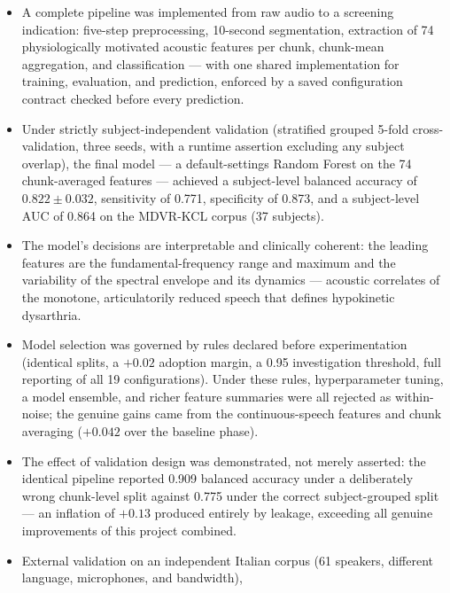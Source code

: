 \begin{itemize}
  \item A complete pipeline was implemented from raw audio to a
        screening indication: five-step preprocessing, 10-second
        segmentation, extraction of 74 physiologically motivated
        acoustic features per chunk, chunk-mean aggregation, and
        classification --- with one shared implementation for training,
        evaluation, and prediction, enforced by a saved configuration
        contract checked before every prediction.
  \item Under strictly subject-independent validation (stratified
        grouped 5-fold cross-validation, three seeds, with a runtime
        assertion excluding any subject overlap), the final model ---
        a default-settings Random Forest on the 74 chunk-averaged
        features --- achieved a subject-level balanced accuracy of
        $0.822 \pm 0.032$, sensitivity of 0.771, specificity of 0.873,
        and a subject-level AUC of 0.864 on the MDVR-KCL corpus
        (37 subjects).
  \item The model's decisions are interpretable and clinically
        coherent: the leading features are the fundamental-frequency
        range and maximum and the variability of the spectral envelope
        and its dynamics --- acoustic correlates of the monotone,
        articulatorily reduced speech that defines hypokinetic
        dysarthria.
  \item Model selection was governed by rules declared before
        experimentation (identical splits, a $+0.02$ adoption margin,
        a 0.95 investigation threshold, full reporting of all 19
        configurations). Under these rules, hyperparameter tuning, a
        model ensemble, and richer feature summaries were all rejected
        as within-noise; the genuine gains came from the
        continuous-speech features and chunk averaging ($+0.042$ over
        the baseline phase).
  \item The effect of validation design was demonstrated, not merely
        asserted: the identical pipeline reported 0.909 balanced
        accuracy under a deliberately wrong chunk-level split against
        0.775 under the correct subject-grouped split --- an inflation
        of $+0.13$ produced entirely by leakage, exceeding all genuine
        improvements of this project combined.
  \item External validation on an independent Italian corpus (61
        speakers, different language, microphones, and bandwidth),

\end{itemize}
